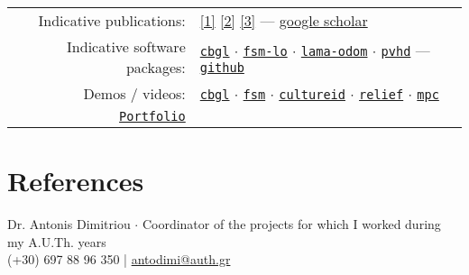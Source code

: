 \documentclass[a4paper,10pt,twoside]{article}
\begin{document}
\begin{tabular}{rp{12cm}}
  Indicative publications: &
\href{https://ieeexplore.ieee.org/abstract/document/9981228}{[1]}
\href{https://www.sciencedirect.com/science/article/abs/pii/S0921889021002323}{[2]}
\href{https://www.tandfonline.com/doi/full/10.1080/00207179.2018.1514129}{[3]} --- \href{https://scholar.google.com/citations?view\_op=list\_works\&hl=en\&user=9\_hI4hMAAAAJ}{google scholar}\\

  Indicative software packages: &
\href{https://github.com/li9i/cbgl}{\texttt{cbgl}} $\cdot$
\href{https://github.com/li9i/fsm-lo}{\texttt{fsm-lo}} $\cdot$
\href{https://github.com/li9i/lama-odom}{\texttt{lama-odom}} $\cdot$
\href{https://github.com/li9i/pandora\_vision\_2014/tree/hydro-devel/pandora\_vision\_hole\_detector}{\texttt{pvhd}} --- \href{https://github.com/li9i}{\texttt{github}}\\

  Demos / videos: & \href{https://www.youtube.com/watch?v=xaDKjI0WkDc}{\texttt{cbgl}} $\cdot$ \href{https://www.youtube.com/watch?v=hB4qsHCEXGI}{\texttt{fsm}} $\cdot$ \href{https://cultureid.web.auth.gr/?page\_id=200&lang=en}{\texttt{cultureid}} $\cdot$ \href{https://relief.web.auth.gr/}{\texttt{relief}} $\cdot$ \href{https://www.youtube.com/watch?v=937OZez1iN8}{\texttt{mpc}}\\

  \href{https://raw.githubusercontent.com/li9i/portfolio/master/portfolio.pdf}{\texttt{Portfolio}} &
\end{tabular}

\section{References}
\noindent Dr. Antonis Dimitriou $\cdot$ Coordinator of the projects for which I worked during my A.U.Th. years \\
  (+30) 697 88 96 350 | \href{mailto:antodimi@auth.gr}{antodimi@auth.gr} \\



\end{document}
